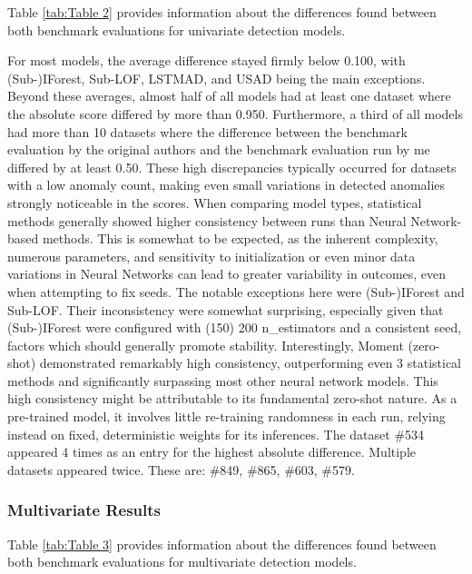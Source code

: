 \documentclass[12pt,oneside]{article}
\begin{document}
Table \ref{tab:Table 2} provides information about the differences found between both benchmark evaluations for univariate detection models. \par
For most models, the average difference stayed firmly below 0.100, with (Sub-)IForest, Sub-LOF, LSTMAD, and USAD being the main exceptions. Beyond these averages, almost half of all models had at least one dataset where the absolute score differed by more than 0.950. Furthermore, a third of all models had more than 10 datasets where the difference between the benchmark evaluation by the original authors and the benchmark evaluation run by me differed by at least 0.50. These high discrepancies typically occurred for datasets with a low anomaly count, making even small variations in detected anomalies strongly noticeable in the scores. When comparing model types, statistical methods generally showed higher consistency between runs than Neural Network-based methods. This is somewhat to be expected, as the inherent complexity, numerous parameters, and sensitivity to initialization or even minor data variations in Neural Networks can lead to greater variability in outcomes, even when attempting to fix seeds. The notable exceptions here were (Sub-)IForest and Sub-LOF. Their inconsistency were somewhat surprising, especially given that (Sub-)IForest were configured with (150) 200 n\_estimators and a consistent seed, factors which should generally promote stability. Interestingly, Moment (zero-shot) demonstrated remarkably high consistency, outperforming even 3 statistical methods and significantly surpassing most other neural network models. This high consistency might be attributable to its fundamental zero-shot nature. As a pre-trained model, it involves little re-training randomness in each run, relying instead on fixed, deterministic weights for its inferences. The dataset \#534 appeared 4 times as an entry for the highest absolute difference. Multiple datasets appeared twice. These are: \#849, \#865, \#603, \#579.

\subsubsection{Multivariate Results}

Table \ref{tab:Table 3} provides information about the differences found between both benchmark evaluations for multivariate detection models.
\end{document}
